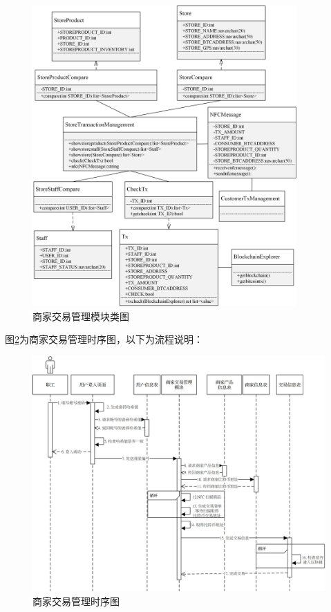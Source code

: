 	\begin{figure}[!htbp]
		\centering
		\includegraphics[width = 0.9\textwidth]{c5.jpg}
		\caption{商家交易管理模块类图}\label{c5}
	\end{figure}


图\ref{time4}为商家交易管理时序图，以下为流程说明：

	\begin{figure}[!htbp]
		\centering
		\includegraphics[width = 1\textwidth]{time4.jpg}
		\caption{商家交易管理时序图}\label{time4}
	\end{figure}

